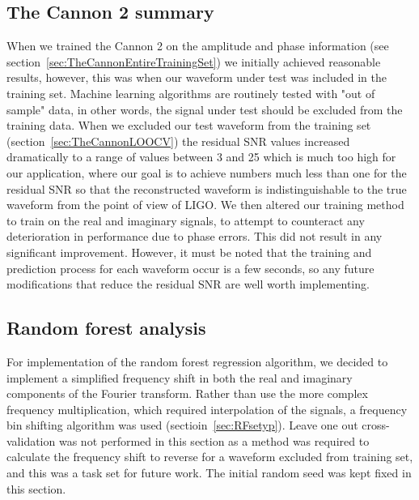 \subsection{The Cannon 2 summary}
When we trained the Cannon 2 on the amplitude and phase information (see section~\ref{sec:TheCannonEntireTrainingSet}) we initially achieved reasonable results, however, this was when our waveform under test was included in the training set. Machine learning algorithms are routinely tested with "out of sample" data, in other words, the signal under test should be excluded from the training data. When we excluded our test waveform from the training set (section~\ref{sec:TheCannonLOOCV}) the residual SNR values increased dramatically to a range of values between 3 and 25 which is much too high for our application, where our goal is to achieve numbers much less than one for the residual SNR so that the reconstructed waveform is indistinguishable to the true waveform from the point of view of LIGO. We then altered our training method to train on the real and imaginary signals, to attempt to counteract any deterioration in performance due to phase errors. This did not result in any significant improvement. However, it must be noted that the training and prediction process for each waveform occur is a few seconds, so any future modifications that reduce the residual SNR are well worth implementing. 
\pagebreak
\subsection{Random forest analysis}
\label{sec:RandomForest}
For implementation of the random forest regression algorithm, we decided to implement a simplified frequency shift in both the real and imaginary components of the Fourier transform. Rather than use the more complex frequency multiplication, which required interpolation of the signals,  a frequency bin shifting algorithm was used (sectioin~\ref{sec:RFsetyp}). Leave one out cross-validation was not performed in this section  as a method was required to calculate the frequency shift to reverse for a waveform excluded from training set, and this was a task set for future work.  The initial random seed was kept fixed in this section. 
